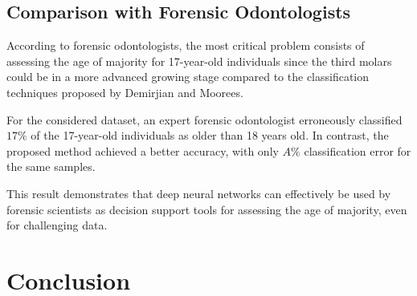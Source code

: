 \documentclass[conference]{IEEEtran}
\begin{document}
\subsection{Comparison with Forensic Odontologists}
According to forensic odontologists, the most critical problem consists of assessing the age of majority for 17-year-old individuals since the third molars could be in a more advanced growing stage compared to the classification techniques proposed by Demirjian and Moorees.

For the considered dataset, an expert forensic odontologist erroneously classified $17\%$ of the 17-year-old individuals as older than 18 years old. In contrast, the proposed method achieved a better accuracy, with only $A\%$ classification error for the same samples.

This result demonstrates that deep neural networks can effectively be used by forensic scientists as decision support tools for assessing the age of majority, even for challenging data.

\section{Conclusion}





\end{document}

